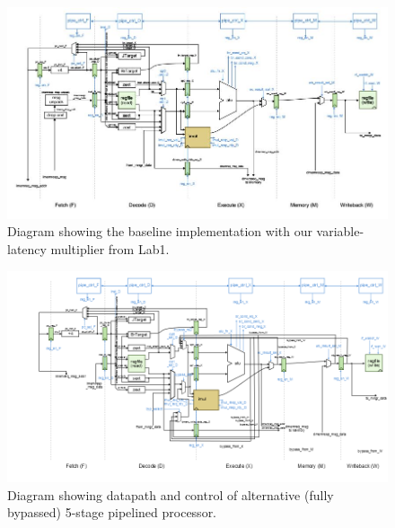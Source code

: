 \documentclass[10pt]{article}
\begin{document}

\begin{figure}[b]
\centering
\includegraphics[scale=0.75]{baselinemult}
\caption{Diagram showing the baseline implementation with our variable-latency multiplier from Lab1.}
\label{fig:baselinemult}
\end{figure}



\begin{figure}[b]
\centering
\includegraphics[scale=0.5]{alt}
\caption{Diagram showing datapath and control of alternative (fully bypassed) 5-stage pipelined processor.}
\label{fig:alternative}
\end{figure}
\end{document}
